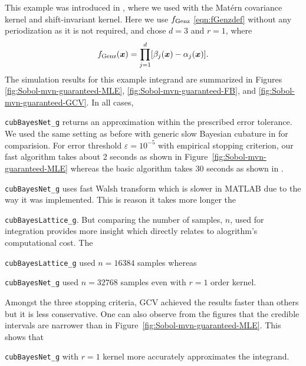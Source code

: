 \documentclass[graybox,footinfo]{svmult}
\newcommand{\bm}[1]{\boldsymbol{#1}}
\newcommand{\vx}{\bm{x}}
\newcommand{\code}[1]{\texttt{#1}}
\newcommand\figref{Figure~\ref}
\begin{document}
This example was introduced in \cite{RatHic19a}, where we used with the Mat\'ern covariance kernel and shift-invariant kernel. 
Here we use $ f_{\textup{Genz}}$ \eqref{eqn:fGenzdef} without any periodization as it is not required, and chose $d=3$ and $r=1$, where 
\begin{equation}
	\label{eqn:fGenzdef}
	f_{\textup{Genz}}(\vx) = \prod_{j=1}^d [\beta_j(\vx) - \alpha_j(\vx)].
\end{equation}
The simulation results for this example integrand are summarized in Figures \ref{fig:Sobol-mvn-guaranteed-MLE}, \ref{fig:Sobol-mvn-guaranteed-FB}, and \ref{fig:Sobol-mvn-guaranteed-GCV}.  In all cases, {\code{cubBayesNet\_g} returns an approximation within the prescribed error tolerance. We used the same setting as before with generic slow Bayesian cubature in \cite{RatHic19a} for comparision. For error threshold $\varepsilon=10^{-5}$ with empirical stopping criterion, our fast algorithm takes about 2 seconds as shown in \figref{fig:Sobol-mvn-guaranteed-MLE} whereas the basic algorithm takes 30 seconds as shown in \cite{RatHic19a}. 
{\code{cubBayesNet\_g} uses fast Walsh transform which is slower in MATLAB due to the way it was implemented. This is reason it takes more longer the {\code{cubBayesLattice\_g}. 
But comparing the number of samples, $n$, used for integration provides more insight which directly relates to alogrithm's computational cost. The {\code{cubBayesLattice\_g} used $n=16384$ samples whereas {\code{cubBayesNet\_g} used $n=32768$ samples even with $r=1$ order kernel.

Amongst the three stopping criteria, GCV achieved the results faster than others but it is less conservative. 
One can also observe from the figures that the credible intervals are narrower than in \figref{fig:Sobol-mvn-guaranteed-MLE}.
This shows that {\code{cubBayesNet\_g} with $r=1$ kernel more accurately approximates the integrand.

}}}}}}
\end{document}

